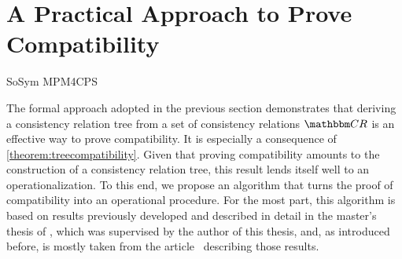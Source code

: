 \section{A Practical Approach to Prove Compatibility}
\label{chap:compatibility:practical_approach}


\begin{copiedFrom}{SoSym MPM4CPS}


The formal approach adopted in the previous section demonstrates that deriving a consistency relation tree from a set of consistency relations $\consistencyrelationset{CR}$ is an effective way to prove compatibility. It is especially a consequence of \autoref{theorem:treecompatibility}. 
Given that proving compatibility amounts to the construction of a consistency relation tree, this result lends itself well to an operationalization. To this end, we propose an algorithm that turns the proof of compatibility into an operational procedure. %
For the most part, this algorithm is based on results previously developed and described in detail in the master's thesis of \textcite{pepin2019ma}, which was supervised by the author of this thesis, and, as introduced before, is mostly taken from the article~ describing those results.


\end{copiedFrom}
